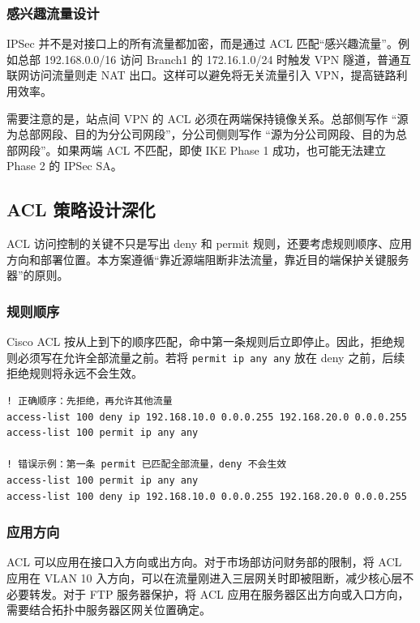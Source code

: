 \documentclass[12pt,a4paper]{ctexart}
\begin{document}
\subsubsection{感兴趣流量设计}

IPSec 并不是对接口上的所有流量都加密，而是通过 ACL 匹配“感兴趣流量”。例如总部 192.168.0.0/16 访问 Branch1 的 172.16.1.0/24 时触发 VPN 隧道，普通互联网访问流量则走 NAT 出口。这样可以避免将无关流量引入 VPN，提高链路利用效率。

需要注意的是，站点间 VPN 的 ACL 必须在两端保持镜像关系。总部侧写作 ``源为总部网段、目的为分公司网段''，分公司侧则写作 ``源为分公司网段、目的为总部网段''。如果两端 ACL 不匹配，即使 IKE Phase 1 成功，也可能无法建立 Phase 2 的 IPSec SA。

\subsection{ACL 策略设计深化}

ACL 访问控制的关键不只是写出 deny 和 permit 规则，还要考虑规则顺序、应用方向和部署位置。本方案遵循“靠近源端阻断非法流量，靠近目的端保护关键服务器”的原则。

\subsubsection{规则顺序}

Cisco ACL 按从上到下的顺序匹配，命中第一条规则后立即停止。因此，拒绝规则必须写在允许全部流量之前。若将 \texttt{permit ip any any} 放在 deny 之前，后续拒绝规则将永远不会生效。

\begin{lstlisting}[caption={ACL 规则顺序示例}, label={lst:acl-order}]
! 正确顺序：先拒绝，再允许其他流量
access-list 100 deny ip 192.168.10.0 0.0.0.255 192.168.20.0 0.0.0.255
access-list 100 permit ip any any

! 错误示例：第一条 permit 已匹配全部流量，deny 不会生效
access-list 100 permit ip any any
access-list 100 deny ip 192.168.10.0 0.0.0.255 192.168.20.0 0.0.0.255
\end{lstlisting}

\subsubsection{应用方向}

ACL 可以应用在接口入方向或出方向。对于市场部访问财务部的限制，将 ACL 应用在 VLAN 10 入方向，可以在流量刚进入三层网关时即被阻断，减少核心层不必要转发。对于 FTP 服务器保护，将 ACL 应用在服务器区出方向或入口方向，需要结合拓扑中服务器区网关位置确定。
\end{document}
